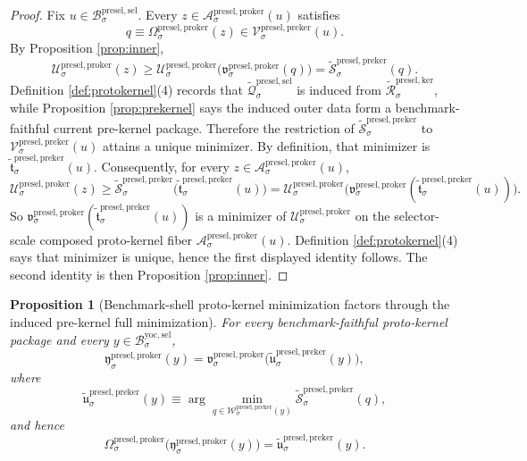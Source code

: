 \documentclass[11pt]{article}
\newcommand{\YoctoSelectorBody}[1]{\mathcal B_{#1}^{\mathrm{yoc,sel}}}
\newcommand{\PreSectionSelectorBody}[1]{\mathcal B_{#1}^{\mathrm{presel,sel}}}
\newcommand{\PreKernelComposedFiber}[2]{\mathcal V_{#1}^{\mathrm{presel,preker}}(#2)}
\newcommand{\PreKernelFullFiber}[2]{\mathcal W_{#1}^{\mathrm{presel,preker}}(#2)}
\newcommand{\ProtoKernelProj}[1]{\Omega_{#1}^{\mathrm{presel,proker}}}
\newcommand{\ProtoKernelFunctional}[1]{\mathscr U_{#1}^{\mathrm{presel,proker}}}
\newcommand{\ProtoKernelMinLift}[1]{\mathfrak v_{#1}^{\mathrm{presel,proker}}}
\newcommand{\ProtoKernelSelectorFiber}[2]{\mathcal A_{#1}^{\mathrm{presel,proker}}(#2)}
\newcommand{\ProtoKernelFullMin}[1]{\mathfrak y_{#1}^{\mathrm{presel,proker}}}
\newcommand{\InducedSelectorFunctional}[1]{\widetilde{\mathscr Q}_{#1}^{\mathrm{presel,sel}}}
\newcommand{\InducedKernelFunctional}[1]{\widetilde{\mathscr R}_{#1}^{\mathrm{presel,ker}}}
\newcommand{\InducedPreKernelFunctional}[1]{\widetilde{\mathscr S}_{#1}^{\mathrm{presel,preker}}}
\newcommand{\InducedPreKernelComposedMin}[1]{\widetilde{\mathfrak t}_{#1}^{\mathrm{presel,preker}}}
\newcommand{\InducedPreKernelFullMin}[1]{\widetilde{\mathfrak u}_{#1}^{\mathrm{presel,preker}}}
\newtheorem{proposition}{Proposition}
\begin{document}
\begin{proof}
Fix \(u\in\PreSectionSelectorBody{\sigma}\). Every \(z\in\ProtoKernelSelectorFiber{\sigma}{u}\) satisfies
\[
q\equiv\ProtoKernelProj{\sigma}(z)\in\PreKernelComposedFiber{\sigma}{u}.
\]
By Proposition \ref{prop:inner},
\[
\ProtoKernelFunctional{\sigma}(z)
\geq
\ProtoKernelFunctional{\sigma}\bigl(\ProtoKernelMinLift{\sigma}(q)\bigr)
=
\InducedPreKernelFunctional{\sigma}(q).
\]
Definition \ref{def:protokernel}(4) records that \(\InducedSelectorFunctional{\sigma}\) is induced from \(\InducedKernelFunctional{\sigma}\), while Proposition \ref{prop:prekernel} says the induced outer data form a benchmark-faithful current pre-kernel package. Therefore the restriction of \(\InducedPreKernelFunctional{\sigma}\) to \(\PreKernelComposedFiber{\sigma}{u}\) attains a unique minimizer. By definition, that minimizer is \(\InducedPreKernelComposedMin{\sigma}(u)\). Consequently, for every \(z\in\ProtoKernelSelectorFiber{\sigma}{u}\),
\[
\ProtoKernelFunctional{\sigma}(z)
\geq
\InducedPreKernelFunctional{\sigma}\bigl(\InducedPreKernelComposedMin{\sigma}(u)\bigr)
=
\ProtoKernelFunctional{\sigma}\bigl(\ProtoKernelMinLift{\sigma}(\InducedPreKernelComposedMin{\sigma}(u))\bigr).
\]
So \(\ProtoKernelMinLift{\sigma}(\InducedPreKernelComposedMin{\sigma}(u))\) is a minimizer of \(\ProtoKernelFunctional{\sigma}\) on the selector-scale composed proto-kernel fiber \(\ProtoKernelSelectorFiber{\sigma}{u}\). Definition \ref{def:protokernel}(4) says that minimizer is unique, hence the first displayed identity follows. The second identity is then Proposition \ref{prop:inner}.
\end{proof}

\begin{proposition}[Benchmark-shell proto-kernel minimization factors through the induced pre-kernel full minimization]
\label{prop:fullfactor}
For every benchmark-faithful proto-kernel package and every \(y\in\YoctoSelectorBody{\sigma}\),
\[
\ProtoKernelFullMin{\sigma}(y)
=
\ProtoKernelMinLift{\sigma}\bigl(\InducedPreKernelFullMin{\sigma}(y)\bigr),
\]
where
\[
\InducedPreKernelFullMin{\sigma}(y)
\equiv
\arg\min_{q\in\PreKernelFullFiber{\sigma}{y}}
\InducedPreKernelFunctional{\sigma}(q),
\]
and hence
\[
\ProtoKernelProj{\sigma}\bigl(\ProtoKernelFullMin{\sigma}(y)\bigr)
=
\InducedPreKernelFullMin{\sigma}(y).
\]
\end{proposition}
\end{document}
